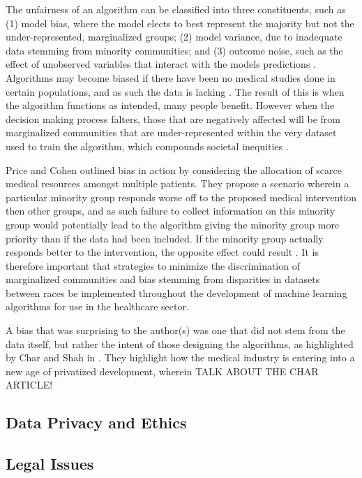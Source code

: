\documentclass[12pt]{article}
\begin{document}
The unfairness of an algorithm can be classified into three constituents, such as (1) model bias, where the model elects to best represent the majority but not the under-represented, marginalized groups; (2) model variance, due to inadequate data stemming from minority communities; and (3) outcome noise, such as the effect of unobserved variables that interact with the models predictions \citep{Chen_2018}. 
Algorithms may become biased if there have been no medical studies done in certain populations, and as such the data is lacking \citep{Char_2018}. The result of this is when the algorithm functions as intended, many people benefit. However when the decision making process falters, those that are negatively affected will be from marginalized communities that are under-represented within the very dataset used to train the algorithm, which compounds societal inequities \citep{Panch_2018}.


Price and Cohen outlined bias in action by considering the allocation of scarce medical resources amongst multiple patients. They propose a scenario wherein a particular minority group responds worse off to the proposed medical intervention then other groups, and as such failure to collect information on this minority group would potentially lead to the algorithm giving the minority group more priority than if the data had been included. If the minority group actually responds better to the intervention, the opposite effect could result \citep{Price_2019}.
It is therefore important that strategies to minimize the discrimination of marginalized communities and bias stemming from disparities in datasets between races be implemented throughout the development of machine learning algorithms for use in the healthcare sector.


A bias that was surprising to the author(s) was one that did not stem from the data itself, but rather the intent of those designing the algorithms, as highlighted by Char and Shah in \citep{Char_2018}. They highlight how the medical industry is entering into a new age of privatized development, wherein TALK ABOUT THE CHAR ARTICLE!

\subsection{Data Privacy and Ethics}

\subsection{Legal Issues}

\newpage


\end{document}
